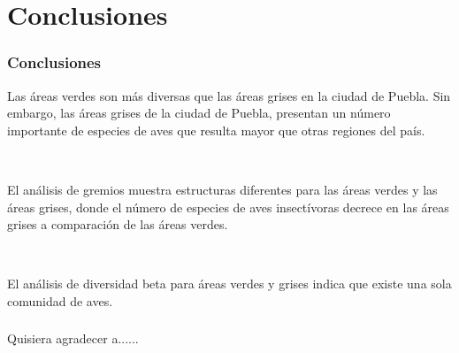 \documentclass[compress]{beamer}
\begin{document}
\section{Conclusiones}
{
\begin{frame}
\frametitle{Conclusiones}
\vspace{-1cm}
\begin{enumerate}
\normalsize{\item  Las áreas verdes son más diversas que las áreas grises en la ciudad de Puebla.
Sin embargo, las áreas grises de la ciudad de Puebla, presentan un número importante de especies de aves que resulta mayor que otras regiones del país.}\\[1cm]
\pause
\normalsize{\item El análisis de gremios muestra estructuras diferentes para las áreas verdes y las áreas grises, donde el número de especies de aves insectívoras decrece en las áreas grises a comparación de las áreas verdes.}\\[1cm]
\pause
\normalsize{\item El análisis de  diversidad beta para áreas verdes y grises indica  que existe una sola comunidad de aves.}
\end{enumerate}

\end{frame}
}
{

\begin{frame}
\frametitle{}
\Huge{ Quisiera agradecer a......}
\end{frame}
}
\end{document}
